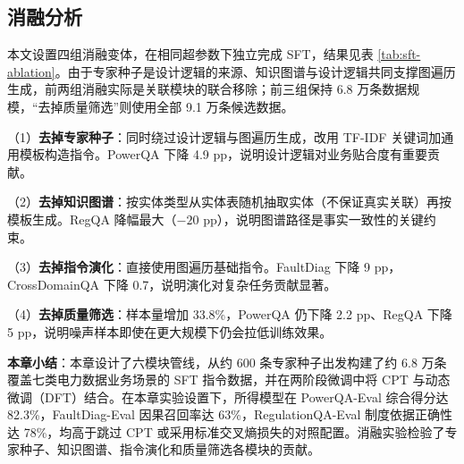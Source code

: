 \documentclass[fontset=fandol,type=master,campus=shenzhen,etitleauto=true]{hithesisbook}
\begin{document}
\subsection{消融分析}\label{ux6d88ux878dux5206ux6790}

本文设置四组消融变体，在相同超参数下独立完成 SFT，结果见表 \ref{tab:sft-ablation}。由于专家种子是设计逻辑的来源、知识图谱与设计逻辑共同支撑图遍历生成，前两组消融实际是关联模块的联合移除；前三组保持 6.8 万条数据规模，“去掉质量筛选”则使用全部 9.1 万条候选数据。

（1）\textbf{去掉专家种子}：同时绕过设计逻辑与图遍历生成，改用 TF-IDF 关键词加通用模板构造指令。PowerQA 下降 4.9 pp，说明设计逻辑对业务贴合度有重要贡献。

（2）\textbf{去掉知识图谱}：按实体类型从实体表随机抽取实体（不保证真实关联）再按模板生成。RegQA 降幅最大（$-20$ pp），说明图谱路径是事实一致性的关键约束。

（3）\textbf{去掉指令演化}：直接使用图遍历基础指令。FaultDiag 下降 9 pp，CrossDomainQA 下降 0.7，说明演化对复杂任务贡献显著。

（4）\textbf{去掉质量筛选}：样本量增加 33.8\%，PowerQA 仍下降 2.2 pp、RegQA 下降 5 pp，说明噪声样本即使在更大规模下仍会拉低训练效果。

\begin{table}[htbp]
\centering
\caption{SFT数据合成管线消融实验结果}
\label{tab:sft-ablation}
\small
{}
\end{table}

\vspace{0.5cm}
\noindent \textbf{本章小结}：本章设计了六模块管线，从约 600 条专家种子出发构建了约 6.8 万条覆盖七类电力数据业务场景的 SFT 指令数据，并在两阶段微调中将 CPT 与动态微调（DFT）结合。在本章实验设置下，所得模型在 PowerQA-Eval 综合得分达 82.3\%，FaultDiag-Eval 因果召回率达 63\%，RegulationQA-Eval 制度依据正确性达 78\%，均高于跳过 CPT 或采用标准交叉熵损失的对照配置。消融实验检验了专家种子、知识图谱、指令演化和质量筛选各模块的贡献。
\end{document}
